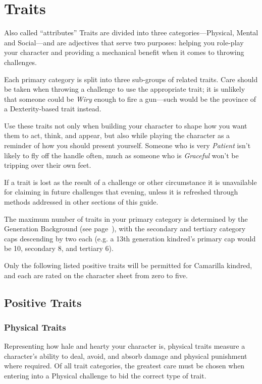 \section{Traits}
\label{sec:traits}
Also called ``attributes'' Traits are divided into three 
categories---Physical, Mental and Social---and are adjectives that serve two 
purposes:  helping you role-play your character and providing a mechanical 
benefit when it comes to throwing challenges.

Each primary category is split into three sub-groups of related traits.  Care 
should be taken when throwing a challenge to use the appropriate trait; 
it is unlikely that someone could be \emph{Wiry} enough to fire a gun---such 
would be the province of a Dexterity-based trait instead.

Use these traits not only when building your character to shape how you 
want them to act, think, and appear, but also while playing the 
character as a reminder of how you should present yourself.  Someone who 
is very \emph{Patient} isn't likely to fly off the handle often, much as 
someone who is \emph{Graceful} won't be tripping over their own feet.

If a trait is lost as the result of a challenge or other circumstance it is 
unavailable for claiming in future challenges that evening, unless it is 
refreshed through methods addressed in other sections of this guide.

The maximum number of traits in your primary category is determined by the 
Generation Background (see page~\pageref{bg:generation}), with the secondary 
and tertiary category caps descending by two each (e.g. a 13th generation 
kindred's primary cap would be 10, secondary 8, and tertiary 6).

Only the following listed positive traits will be permitted for Camarilla 
kindred, and each are rated on the character sheet from zero to five.

\subsection{Positive Traits}
\subsubsection{Physical Traits}
Representing how hale and hearty your character is, physical traits 
measure a character's ability to deal, avoid, and absorb damage and 
physical punishment where required.  Of all trait categories, the 
greatest care must be chosen when entering into a Physical challenge 
to bid the correct type of trait.

